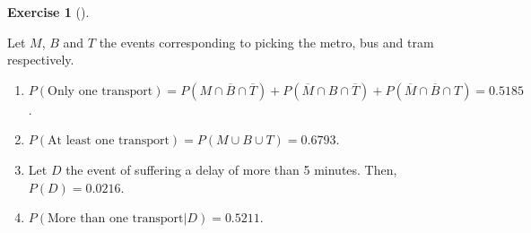 \documentclass[
  a4paper,
]{scrreport}
\theoremstyle{definition}
\newtheorem{exercise}{Exercise}[chapter]
\theoremstyle{remark}
\begin{document}
\begin{exercise}[]
\begin{tcolorbox}
Let \(M\), \(B\) and \(T\) the events corresponding to picking the
metro, bus and tram respectively.

\begin{enumerate}
\def\labelenumi{\alph{enumi}.}
\item
  \(P(\mbox{Only one transport}) = P(M\cap\overline B\cap \overline T) + P(\overline M\cap B\cap \overline T) + P(\overline M \cap \overline B\cap T) = 0.5185\).
\item
  \(P(\mbox{At least one transport}) = P(M\cup B\cup T) = 0.6793\).
\item
  Let \(D\) the event of suffering a delay of more than 5 minutes. Then,
  \(P(D) = 0.0216\).
\item
  \(P(\mbox{More than one transport}|D) = 0.5211\).
\end{enumerate}

\end{tcolorbox}

\end{exercise}
\end{document}
